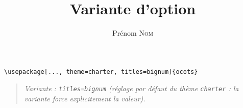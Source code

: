 \documentclass[11pt]{ocots-book}
\title{Variante d'option}
\author{Prénom \textsc{Nom}}
\newcommand{\ocotsvariantnote}[1]{\begin{quote}\itshape Variante : #1\end{quote}}
\begin{document}
\maketitle

\begin{lstlisting}
\usepackage[..., theme=charter, titles=bignum]{ocots}
\end{lstlisting}
\ocotsvariantnote{\texttt{titles=bignum} (r\'eglage par d\'efaut du th\`eme \texttt{charter} : la variante force explicitement la valeur).}

\end{document}
